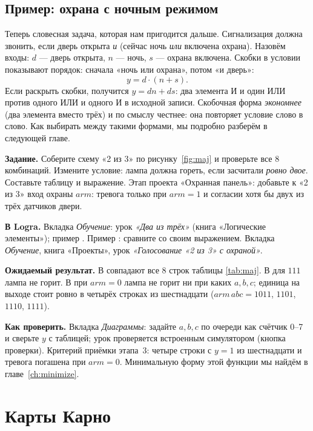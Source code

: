 \subsection{Пример: охрана с ночным режимом}

Теперь словесная задача, которая нам пригодится дальше. Сигнализация
должна звонить, если дверь открыта \emph{и} (сейчас ночь \emph{или}
включена охрана). Назовём входы: $d$ --- дверь открыта, $n$ --- ночь,
$s$ --- охрана включена. Скобки в условии показывают порядок: сначала
«ночь или охрана», потом «и дверь»:
\[
  y = d\cdot(n + s).
\]
Если раскрыть скобки, получится $y = dn + ds$: два элемента И и один ИЛИ
против одного ИЛИ и одного И в исходной записи. Скобочная форма
\emph{экономнее} (два элемента вместо трёх) и по смыслу честнее: она
повторяет условие слово в слово. Как выбирать между такими формами, мы
подробно разберём в следующей главе.

\begin{diybox}
\textbf{Задание.}  Соберите схему «2 из 3» по рисунку~\ref{fig:maj}
и проверьте все 8 комбинаций.  Измените условие: лампа должна
гореть, если засчитали \emph{ровно двое}. Составьте таблицу и выражение.
 Этап проекта «Охранная панель»: добавьте к «2 из 3» вход
охраны $arm$: тревога только при $arm=1$ и согласии хотя бы двух из трёх
датчиков двери.

\textbf{В Logra.}  Вкладка \emph{Обучение}: урок
\emph{«Два из трёх»} (книга «Логические элементы»); пример
.  Пример : сравните со своим
выражением.  Вкладка \emph{Обучение}, книга «Проекты»,
урок \emph{«Голосование «2 из 3» с охраной»}.

\textbf{Ожидаемый результат.} В  совпадают все 8 строк таблицы
\ref{tab:maj}. В  для $111$ лампа не горит. В 
при $arm=0$ лампа не горит ни при каких $a,b,c$; единица на выходе
стоит ровно в четырёх строках из шестнадцати ($arm\,abc=1011$, $1101$,
$1110$, $1111$).

\textbf{Как проверить.} Вкладка \emph{Диаграммы}: задайте $a,b,c$ по
очереди как счётчик 0--7 и сверьте $y$ с таблицей; урок проверяется
встроенным симулятором (кнопка проверки). Критерий приёмки этапа~3:
четыре строки с $y=1$ из шестнадцати и тревога погашена при $arm=0$.
Минимальную форму этой функции мы найдём в главе~\ref{ch:minimize}.
\end{diybox}

\section{Карты Карно}

